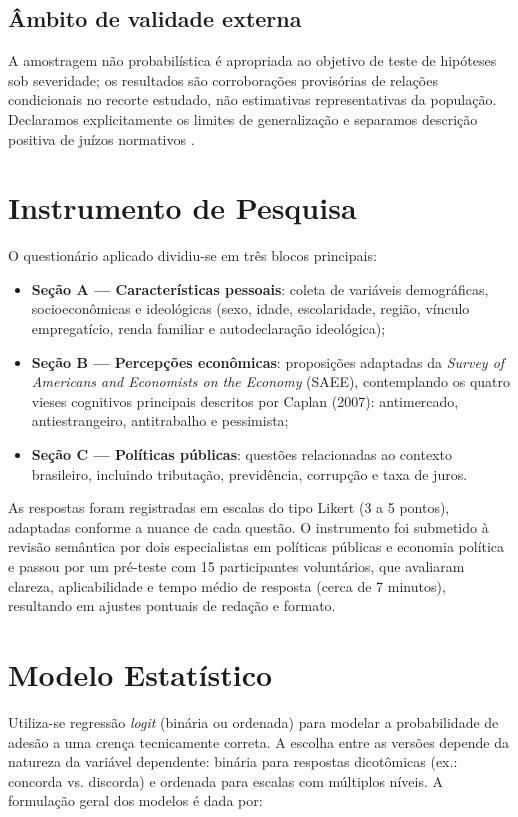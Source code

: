 \subsection{Âmbito de validade externa}
A amostragem não probabilística é apropriada ao objetivo de teste de hipóteses sob severidade; os resultados são corroborações provisórias de relações condicionais no recorte estudado, não estimativas representativas da população. Declaramos explicitamente os limites de generalização e separamos descrição positiva de juízos normativos \cite{hausman2008}.


\section{Instrumento de Pesquisa}

O questionário aplicado dividiu-se em três blocos principais:
\begin{itemize}
    \item \textbf{Seção A — Características pessoais}: coleta de variáveis demográficas, socioeconômicas e ideológicas (sexo, idade, escolaridade, região, vínculo empregatício, renda familiar e autodeclaração ideológica);
    \item \textbf{Seção B — Percepções econômicas}: proposições adaptadas da \textit{Survey of Americans and Economists on the Economy} (SAEE), contemplando os quatro vieses cognitivos principais descritos por Caplan (2007): antimercado, antiestrangeiro, antitrabalho e pessimista;
    \item \textbf{Seção C — Políticas públicas}: questões relacionadas ao contexto brasileiro, incluindo tributação, previdência, corrupção e taxa de juros.
\end{itemize}

As respostas foram registradas em escalas do tipo Likert (3 a 5 pontos), adaptadas conforme a nuance de cada questão. O instrumento foi submetido à revisão semântica por dois especialistas em políticas públicas e economia política e passou por um pré-teste com 15 participantes voluntários, que avaliaram clareza, aplicabilidade e tempo médio de resposta (cerca de 7 minutos), resultando em ajustes pontuais de redação e formato.

\section{Modelo Estatístico}\label{sec:modelo-estatistico}

Utiliza-se regressão \textit{logit} (binária ou ordenada) para modelar a probabilidade de adesão a uma crença tecnicamente correta. A escolha entre as versões depende da natureza da variável dependente: binária para respostas dicotômicas (ex.: concorda vs. discorda) e ordenada para escalas com múltiplos níveis. A formulação geral dos modelos é dada por:

